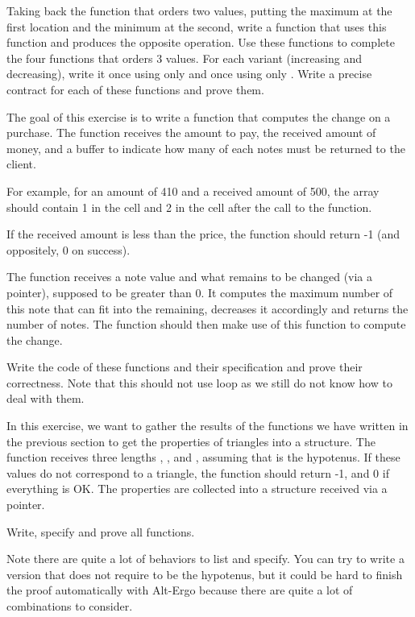 \label{l4:contract-modularity-ex-order-3}


Taking back the function  that orders two values,
putting the maximum at the first location and the minimum at the second,
write a function  that uses this function and
produces the opposite operation. Use these functions to complete the
four functions that orders 3 values. For each variant (increasing and
decreasing), write it once using only  and once
using only . Write a precise contract for each of
these functions and prove them.







The goal of this exercise is to write a function that computes the change
on a purchase. The function  receives the amount
to pay, the received amount of money, and a buffer to indicate how
many of each notes must be returned to the client.


For example, for an amount of 410 and a received amount of 500, the array
should contain 1 in the cell  and 2 in the cell
 after the call to the function.


If the received amount is less than the price, the function should
return -1 (and oppositely, 0 on success).




The function  receives a note value and
what remains to be changed (via a pointer), supposed to be greater than
0. It computes the maximum number of this note that can fit into the
remaining, decreases it accordingly and returns the number of notes.
The function  should then make use of this function
to compute the change.


Write the code of these functions and their specification and prove their
correctness. Note that this should not use loop as we still do not know
how to deal with them.




In this exercise, we want to gather the results of the functions we have
written in the previous section to get the properties of triangles into
a structure. The function  receives three lengths
, , and , assuming that
 is the hypotenus. If these values do not correspond to a
triangle, the function should return -1, and 0 if everything is OK. The
properties are collected into a structure  received via
a pointer.




Write, specify and prove all functions.


Note there are quite a lot of behaviors to list and specify. You can try
to write a version that does not require  to be the hypotenus,
but it could be hard to finish the proof automatically with
Alt-Ergo because there are quite a lot of combinations to consider.
